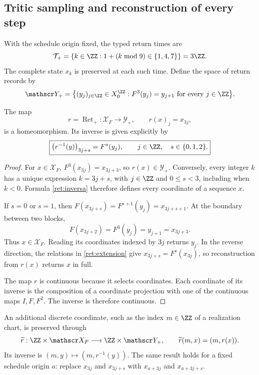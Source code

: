 \subsection{Tritic sampling and reconstruction of every step}

With the schedule origin fixed, the typed return times are
\[
 \mathcal T_+
 =\{k\in\ZZ:1+(k\bmod 9)\in\{1,4,7\}\}=3\ZZ.
\]
The complete state \(x_k\) is preserved at each such time.
Define the space of return records by
\begin{equation}
 \mathscr Y_+
 =\bigl\{(y_j)_{j\in\ZZ}\in X_0^{\ZZ}:
                 F^3(y_j)=y_{j+1}\text{ for every }j\in\ZZ\bigr\}.
 \label{ret:registros}
\end{equation}

\begin{theorem}
\label{ret:homeomorfismo}
The map
\[
 r=\operatorname{Ret}_+:\mathscr X_F\longrightarrow\mathscr Y_+,
 \qquad r(x)_j=x_{3j},
\]
is a homeomorphism. Its inverse is given explicitly by
\begin{equation}
 \boxed{
  \bigl(r^{-1}(y)\bigr)_{3j+s}=F^s(y_j),
  \qquad j\in\ZZ,\quad s\in\{0,1,2\}.}
 \label{ret:inversa}
\end{equation}
\end{theorem}
\begin{proof}
For \(x\in\mathscr X_F\),
\(F^3(x_{3j})=x_{3j+3}\), so \(r(x)\in\mathscr Y_+\).
Conversely, every integer \(k\) has a unique expression
\(k=3j+s\), with \(j\in\ZZ\) and \(0\le s<3\), including when
\(k<0\). Formula \eqref{ret:inversa} therefore defines every
coordinate of a sequence \(x\).

If \(s=0\) or \(s=1\), then
\(F(x_{3j+s})=F^{s+1}(y_j)=x_{3j+s+1}\).
At the boundary between two blocks,
\[
 F(x_{3j+2})=F^3(y_j)=y_{j+1}=x_{3j+3}.
\]
Thus \(x\in\mathscr X_F\).
Reading its coordinates indexed by \(3j\) returns \(y_j\).
In the reverse direction, the relations in \eqref{ret:extension} give
\(x_{3j+s}=F^s(x_{3j})\), so reconstruction from \(r(x)\)
returns \(x\) in full.

The map \(r\) is continuous because it selects coordinates.
Each coordinate of its inverse is the composition of a coordinate
projection with one of the continuous maps \(I,F,F^2\).
The inverse is therefore continuous.
\end{proof}

An additional discrete coordinate, such as the index \(m\in\ZZ\)
of a realization chart, is preserved through
\[
 \widetilde r:\ZZ\times\mathscr X_F
 \longrightarrow\ZZ\times\mathscr Y_+,
 \qquad \widetilde r(m,x)=(m,r(x)).
\]
Its inverse is \((m,y)\mapsto(m,r^{-1}(y))\).
The same result holds for a fixed schedule origin \(a\):
replace \(x_{3j}\) and \(x_{3j+s}\) with
\(x_{a+3j}\) and \(x_{a+3j+s}\).

